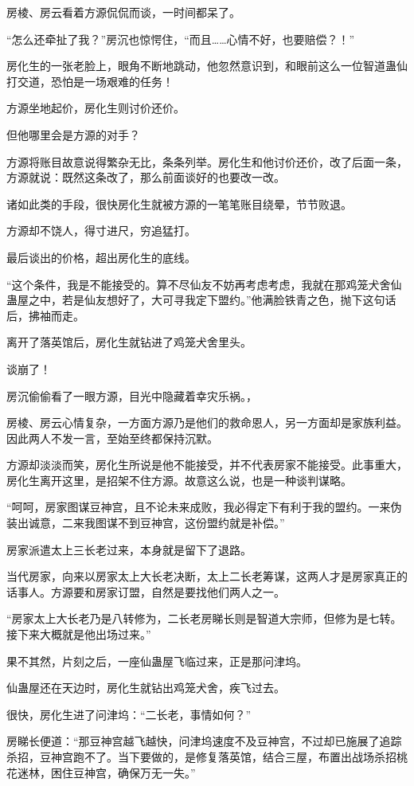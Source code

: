 \begin{this_body}
房棱、房云看着方源侃侃而谈，一时间都呆了。

“怎么还牵扯了我？”房沉也惊愕住，“而且……心情不好，也要赔偿？！”

房化生的一张老脸上，眼角不断地跳动，他忽然意识到，和眼前这么一位智道蛊仙打交道，恐怕是一场艰难的任务！

方源坐地起价，房化生则讨价还价。

但他哪里会是方源的对手？

方源将账目故意说得繁杂无比，条条列举。房化生和他讨价还价，改了后面一条，方源就说：既然这条改了，那么前面谈好的也要改一改。

诸如此类的手段，很快房化生就被方源的一笔笔账目绕晕，节节败退。

方源却不饶人，得寸进尺，穷追猛打。

最后谈出的价格，超出房化生的底线。

“这个条件，我是不能接受的。算不尽仙友不妨再考虑考虑，我就在那鸡笼犬舍仙蛊屋之中，若是仙友想好了，大可寻我定下盟约。”他满脸铁青之色，抛下这句话后，拂袖而走。

离开了落英馆后，房化生就钻进了鸡笼犬舍里头。

谈崩了！

房沉偷偷看了一眼方源，目光中隐藏着幸灾乐祸。，

房棱、房云心情复杂，一方面方源乃是他们的救命恩人，另一方面却是家族利益。因此两人不发一言，至始至终都保持沉默。

方源却淡淡而笑，房化生所说是他不能接受，并不代表房家不能接受。此事重大，房化生离开这里，是招架不住方源。故意这么说，也是一种谈判谋略。

“呵呵，房家图谋豆神宫，且不论未来成败，我必得定下有利于我的盟约。一来伪装出诚意，二来我图谋不到豆神宫，这份盟约就是补偿。”

房家派遣太上三长老过来，本身就是留下了退路。

当代房家，向来以房家太上大长老决断，太上二长老筹谋，这两人才是房家真正的话事人。方源要和房家订盟，自然是要找他们两人之一。

“房家太上大长老乃是八转修为，二长老房睇长则是智道大宗师，但修为是七转。接下来大概就是他出场过来。”

果不其然，片刻之后，一座仙蛊屋飞临过来，正是那问津坞。

仙蛊屋还在天边时，房化生就钻出鸡笼犬舍，疾飞过去。

很快，房化生进了问津坞：“二长老，事情如何？”

房睇长便道：“那豆神宫越飞越快，问津坞速度不及豆神宫，不过却已施展了追踪杀招，豆神宫跑不了。当下要做的，是修复落英馆，结合三屋，布置出战场杀招桃花迷林，困住豆神宫，确保万无一失。”


\end{this_body}
